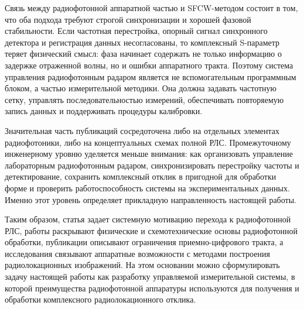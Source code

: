 Связь между радиофотонной аппаратной частью и SFCW-методом состоит в том, что
оба подхода требуют строгой синхронизации и хорошей фазовой стабильности. Если
частотная перестройка, опорный сигнал синхронного детектора и регистрация данных
несогласованы, то комплексный S-параметр теряет физический смысл: фаза начинает
содержать не только информацию о задержке отраженной волны, но и ошибки аппаратного
тракта. Поэтому система управления радиофотонным радаром является не вспомогательным
программным блоком, а частью измерительной методики. Она должна задавать частотную
сетку, управлять последовательностью измерений, обеспечивать повторяемую запись
данных и поддерживать процедуры калибровки.

Значительная часть публикаций сосредоточена либо на отдельных элементах
радиофотоники, либо на концептуальных схемах полной РЛС. Промежуточному
инженерному уровню уделяется меньше внимания: как организовать управление
лабораторным радиофотонным радаром, синхронизировать перестройку частоты и
детектирование, сохранить комплексный отклик в пригодной для обработки форме
и проверить работоспособность системы на экспериментальных данных. Именно этот
уровень определяет прикладную направленность настоящей работы.

Таким образом, статья \cite{shumov2016concept} задает системную мотивацию перехода
к радиофотонной РЛС, работы \cite{zaitsev2012nanophotonics,
belousov2014radiophotonic, gamilovskaya2015uwb, pan2014microwave} раскрывают
физические и схемотехнические основы радиофотонной обработки, публикации
\cite{starikov2015photonicadc, valley2007photonicadc, khilo2012photonicadc}
описывают ограничения приемно-цифрового тракта, а исследования
\cite{sun2019advanced, eide2019advanced, noon1996stepped} связывают аппаратные
возможности с методами построения радиолокационных изображений. На этом основании
можно сформулировать задачу настоящей работы как разработку управляемой
измерительной системы, в которой преимущества радиофотонной аппаратуры используются
для получения и обработки комплексного радиолокационного отклика.
